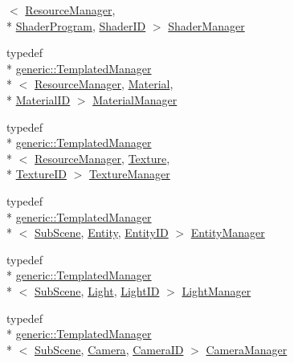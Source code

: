 \begin{DoxyCompactItemize}
$<$ \hyperlink{classkglt_1_1_resource_manager}{Resource\-Manager}, \\*
\hyperlink{classkglt_1_1_shader_program}{Shader\-Program}, \hyperlink{namespacekglt_a2aafe4bf33d26659020117cad360422f}{Shader\-I\-D} $>$ \hyperlink{namespacekglt_ae2013bec7afa0f68c33ffc4eba21bf1f}{Shader\-Manager}
\item 
typedef \\*
\hyperlink{classkglt_1_1generic_1_1_templated_manager}{generic\-::\-Templated\-Manager}\\*
$<$ \hyperlink{classkglt_1_1_resource_manager}{Resource\-Manager}, \hyperlink{classkglt_1_1_material}{Material}, \\*
\hyperlink{namespacekglt_a5ffac6377a7d3e163b4d5c31f71db43a}{Material\-I\-D} $>$ \hyperlink{namespacekglt_a912e51432ed9811883e2c8b07491d3c6}{Material\-Manager}
\item 
typedef \\*
\hyperlink{classkglt_1_1generic_1_1_templated_manager}{generic\-::\-Templated\-Manager}\\*
$<$ \hyperlink{classkglt_1_1_resource_manager}{Resource\-Manager}, \hyperlink{classkglt_1_1_texture}{Texture}, \\*
\hyperlink{namespacekglt_aaea040f25edb7f75ca0f3aa8136a45a1}{Texture\-I\-D} $>$ \hyperlink{namespacekglt_a7fb916291048874ce18ede38682511c9}{Texture\-Manager}
\item 
typedef \\*
\hyperlink{classkglt_1_1generic_1_1_templated_manager}{generic\-::\-Templated\-Manager}\\*
$<$ \hyperlink{classkglt_1_1_sub_scene}{Sub\-Scene}, \hyperlink{classkglt_1_1_entity}{Entity}, \hyperlink{namespacekglt_a693458ae13c224ae3ea4074ac3a0b02a}{Entity\-I\-D} $>$ \hyperlink{namespacekglt_a8677c357131c7745e0bf278a777478c6}{Entity\-Manager}
\item 
typedef \\*
\hyperlink{classkglt_1_1generic_1_1_templated_manager}{generic\-::\-Templated\-Manager}\\*
$<$ \hyperlink{classkglt_1_1_sub_scene}{Sub\-Scene}, \hyperlink{classkglt_1_1_light}{Light}, \hyperlink{namespacekglt_ab90464803ef8e3c1f6da41388e859968}{Light\-I\-D} $>$ \hyperlink{namespacekglt_a67c1f31982b8d0c54506d309b20780e2}{Light\-Manager}
\item 
typedef \\*
\hyperlink{classkglt_1_1generic_1_1_templated_manager}{generic\-::\-Templated\-Manager}\\*
$<$ \hyperlink{classkglt_1_1_sub_scene}{Sub\-Scene}, \hyperlink{classkglt_1_1_camera}{Camera}, \hyperlink{namespacekglt_a2a2b79f136b052b58ec737bd9c885429}{Camera\-I\-D} $>$ \hyperlink{namespacekglt_a62f4cbff006c7d1239f2c357cff9e3fd}{Camera\-Manager}

\end{DoxyCompactItemize}
